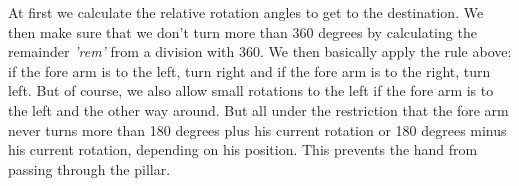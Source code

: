 At first we calculate the relative rotation angles to get to the destination. We then make sure that we don't turn more than 360 degrees by calculating the remainder {\em 'rem'} from a division with 360. We then basically apply the rule above: if the fore arm is to the left, turn right and if the fore arm is to the right, turn left. But of course, we also allow small rotations to the left if the fore arm is to the left and the other way around. But all under the restriction that the fore arm never turns more than 180 degrees plus his current rotation or 180 degrees minus his current rotation, depending on his position. This prevents the hand from passing through the pillar.

